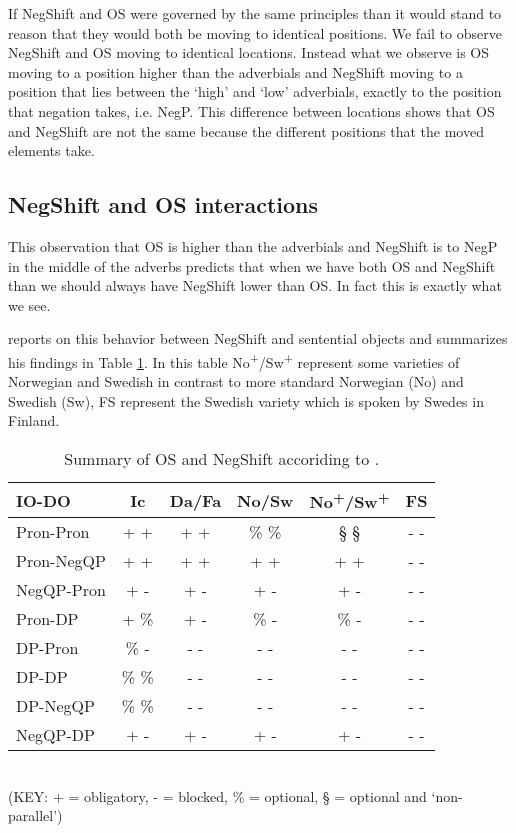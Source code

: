 \documentclass[12pt, letterpaper]{article}
\begin{document}
If NegShift and OS were governed by the same principles than it would stand to reason that they would both be moving to identical positions. We fail to observe NegShift and OS moving to identical locations. Instead what we observe is OS moving to a position higher than the adverbials and NegShift moving to a position that lies between the `high' and `low' adverbials, exactly to the position that negation takes, i.e. NegP. This difference between locations shows that OS and NegShift are not the same because the different positions that the moved elements take.

\subsection{NegShift and OS interactions} \label{sec:INTERACTION}

This observation that OS is higher than the adverbials and NegShift is to NegP in the middle of the adverbs predicts that when we have both OS and NegShift than we should always have NegShift lower than OS. In fact this is exactly what we see.

\citet{christensenInterfacesNegationSyntax2005} reports on this behavior between NegShift and sentential objects and summarizes his findings in Table \ref{tab:OSNEGS}. In this table No\textsuperscript{+}/Sw\textsuperscript{+} represent some varieties of Norwegian and Swedish in contrast to more standard Norwegian (No) and Swedish (Sw), FS represent the Swedish variety which is spoken by Swedes in Finland.
\begin{table}[h!]
\centering
\caption{Summary of OS and NegShift accoriding to \citet{christensenInterfacesNegationSyntax2005}.}
\label{tab:OSNEGS}
\begin{tabular}{lccccc}
\hline
IO-DO & Ic & Da/Fa & No/Sw & No\textsuperscript{+}/Sw\textsuperscript{+} & FS  \\
\hline 
Pron-Pron	&	+ +	&	+ +	&	\% \%	&	§ §	&	- -	\\
Pron-NegQP	&	+ +	&	+ +	&	+ +	&	+ +	&	- -	\\
NegQP-Pron	&	+ -	&	+ -	&	+ -	&	+ -	&	- -	\\
Pron-DP	&	+ \%	&	+ -	&	\% -	&	\% -	&	- -	\\
DP-Pron	&	\% -	&	- -	&	- -	&	- -	&	- -	\\
DP-DP	&	\% \%	&	- -	&	- -	&	- -	&	- -	\\
DP-NegQP	&	\% \%	&	- -	&	- -	&	- -	&	- -	\\
NegQP-DP	&	+ -	&	+ -	&	+ -	&	+ -	&	- -	\\
\hline 
\end{tabular}\\
(KEY: + = obligatory, - = blocked, \% = optional, § = optional and `non-parallel’)
\end{table}
\end{document}
